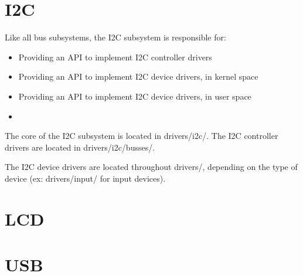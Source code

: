 \chapter{I2C}
Like all bus subsystems, the I2C subsystem is responsible for:
\begin{itemize}
\item Providing an API to implement I2C controller drivers
\item Providing an API to implement I2C device drivers, in kernel space
\item Providing an API to implement I2C device drivers, in user space
\item
\end{itemize}
The core of the I2C subsystem is located in drivers/i2c/.
The I2C controller drivers are located in drivers/i2c/busses/.

The I2C device drivers are located throughout drivers/, depending on the type
of device (ex: drivers/input/ for input devices).








\chapter{LCD}



\chapter{USB}
